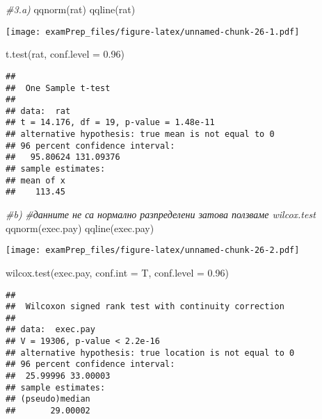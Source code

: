 \documentclass[
]{article}
\newenvironment{Shaded}{\begin{snugshade}}{\end{snugshade}}
\newcommand{\AttributeTok}[1]{\textcolor[rgb]{0.77,0.63,0.00}{#1}}
\newcommand{\CommentTok}[1]{\textcolor[rgb]{0.56,0.35,0.01}{\textit{#1}}}
\newcommand{\FloatTok}[1]{\textcolor[rgb]{0.00,0.00,0.81}{#1}}
\newcommand{\FunctionTok}[1]{\textcolor[rgb]{0.00,0.00,0.00}{#1}}
\newcommand{\NormalTok}[1]{#1}
\begin{document}
\begin{Shaded}
\begin{Highlighting}[]
\CommentTok{\#3.a)}
\FunctionTok{qqnorm}\NormalTok{(rat)}
\FunctionTok{qqline}\NormalTok{(rat)}
\end{Highlighting}
\end{Shaded}

\texttt{[image: examPrep\_files/figure-latex/unnamed-chunk-26-1.pdf]}

\begin{Shaded}
\begin{Highlighting}[]
\FunctionTok{t.test}\NormalTok{(rat, }\AttributeTok{conf.level =} \FloatTok{0.96}\NormalTok{)}
\end{Highlighting}
\end{Shaded}

\begin{verbatim}
## 
##  One Sample t-test
## 
## data:  rat
## t = 14.176, df = 19, p-value = 1.48e-11
## alternative hypothesis: true mean is not equal to 0
## 96 percent confidence interval:
##   95.80624 131.09376
## sample estimates:
## mean of x 
##    113.45
\end{verbatim}

\begin{Shaded}
\begin{Highlighting}[]
\CommentTok{\#b)}
\CommentTok{\#данните не са нормално разпределени затова ползваме wilcox.test}
\FunctionTok{qqnorm}\NormalTok{(exec.pay)}
\FunctionTok{qqline}\NormalTok{(exec.pay)}
\end{Highlighting}
\end{Shaded}

\texttt{[image: examPrep\_files/figure-latex/unnamed-chunk-26-2.pdf]}

\begin{Shaded}
\begin{Highlighting}[]
\FunctionTok{wilcox.test}\NormalTok{(exec.pay, }\AttributeTok{conf.int =}\NormalTok{ T, }\AttributeTok{conf.level =} \FloatTok{0.96}\NormalTok{)}
\end{Highlighting}
\end{Shaded}

\begin{verbatim}
## 
##  Wilcoxon signed rank test with continuity correction
## 
## data:  exec.pay
## V = 19306, p-value < 2.2e-16
## alternative hypothesis: true location is not equal to 0
## 96 percent confidence interval:
##  25.99996 33.00003
## sample estimates:
## (pseudo)median 
##       29.00002
\end{verbatim}
\end{document}
